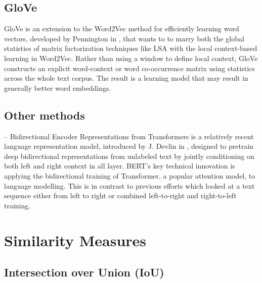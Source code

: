 \subsection{GloVe}

GloVe is an extension to the Word2Vec method for efficiently learning
word vectors, developed by Pennington \etal{} in ,
that wants to to marry both the global statistics of matrix
factorization techniques like LSA with the local context-based
learning in Word2Vec. Rather than using a window to define local
context, GloVe constructs an explicit word-context or word
co-occurrence matrix using statistics across the whole text corpus.
The result is a learning model that may result in generally better
word embeddings.

\subsection{Other methods}

 -- Bidirectional Encoder Representations from Transformers is a relatively recent language representation model, introduced by J. Devlin \etal{} in ,  designed to pretrain deep bidirectional representations from
unlabeled text by jointly conditioning on both left and right context in all layer. BERT’s key technical innovation is applying the bidirectional training of Transformer, a popular attention model, to language modelling. This is in contrast to previous efforts which looked at a text sequence either from left to right or combined left-to-right and right-to-left training.


\section{Similarity Measures}

\subsection{Intersection over Union (IoU)}

